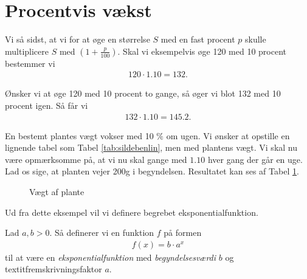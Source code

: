 \section*{Procentvis vækst}

Vi så sidst, at vi for at øge en størrelse $S$ med en fast procent $p$ skulle multiplicere 
$S$ med $(1 + \frac{p}{100})$. Skal vi eksempelvis øge 120 med 10 procent bestemmer vi
\begin{align*}
	120 \cdot 1.10 = 132.
\end{align*}

Ønsker vi at øge 120 med 10 procent to gange, så øger vi blot 132 med 10 procent igen. Så får vi
\begin{align*}
	132 \cdot 1.10 = 145.2.
\end{align*}

\begin{exa}
	En bestemt plantes vægt vokser med 10 $\%$ om ugen. Vi ønsker at opstille en lignende tabel
	 som Tabel \ref{tab:sildebenlin}, men med plantens vægt. Vi skal nu være opmærksomme på, at  
	 vi nu skal gange med $1.10$ hver gang der går en uge. Lad os sige, at planten vejer 200g i 
	 begyndelsen. Resultatet kan ses af Tabel \ref{tab:sildebenplante}.
	 \begin{figure}[H]
		\center
		\caption{Vægt af plante}
		\label{tab:sildebenplante}
	\end{figure}
\end{exa}

Ud fra dette eksempel vil vi definere begrebet eksponentialfunktion.
\begin{defn}[Eksponentialfunktion]
	Lad $a,b>0$. Så definerer vi en funktion $f$ på formen 
	\begin{align*}
		f(x) = b\cdot a^x
	\end{align*}
	til at være en \textit{eksponentialfunktion} med \textit{begyndelsesværdi} $b$ og 
	textit{fremskrivningsfaktor} $a$. 
\end{defn}

